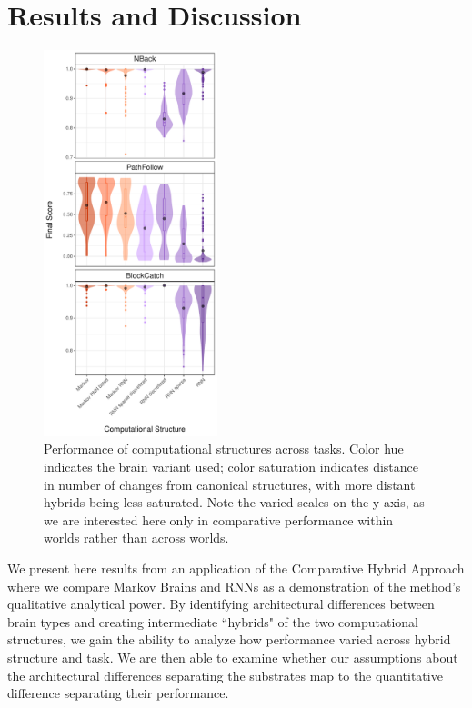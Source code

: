 \section{Results and Discussion}

\begin{figure}
    \includegraphics[width=0.45\textwidth]{chapters/2-comp-hybrid/figs/merged_LOD_data_end_score.pdf}
    \caption{Performance of computational structures across tasks. Color hue indicates the brain variant used; color saturation indicates distance in number of changes from canonical structures, with more distant hybrids being less saturated. Note the varied scales on the y-axis, as we are interested here only in comparative performance within worlds rather than across worlds.}
    \label{fig:scores}
\end{figure}



We present here results from an application of the Comparative Hybrid Approach where we compare Markov Brains and RNNs as a demonstration of the method's qualitative analytical power. 
By identifying architectural differences between brain types and creating intermediate ``hybrids" of the two computational structures, we gain the ability to analyze how performance varied across hybrid structure and task. 
We are then able to examine whether our assumptions about the architectural differences separating the substrates map to the quantitative difference separating their performance.


